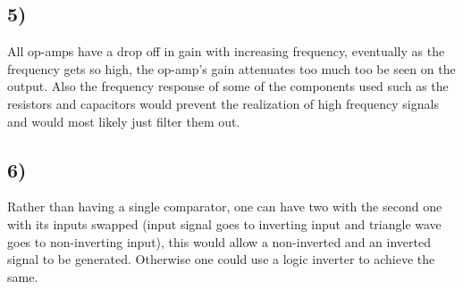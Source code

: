 \documentclass[]{IEEEtran}
\begin{document}
\begin{multicols}{2}
	\subsection{5)}
	All op-amps have a drop off in gain with increasing frequency, eventually as the frequency gets so high, the op-amp's gain attenuates too much too be seen on the output. Also the frequency response of some of the components used such as the resistors and capacitors would prevent the realization of high frequency signals and would most likely just filter them out.
	\subsection{6)}
	Rather than having a single comparator, one can have two with the second one with its inputs swapped (input signal goes to inverting input and triangle wave goes to non-inverting input), this would allow a non-inverted and an inverted signal to be generated. Otherwise one could use a logic inverter to achieve the same.
\end{multicols}
\end{document}
